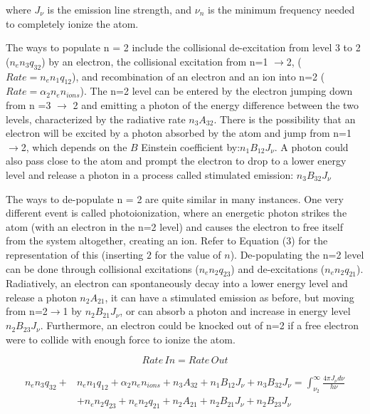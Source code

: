 \documentclass{article}
\begin{document}
where $J_{\nu}$ is the emission line strength, and $\nu_n$ is the minimum frequency needed to completely ionize the atom.

The ways to populate n = 2 include the collisional de-excitation from level 3 to 2 ($n_e n_{3} q_{32}$) by an electron, the collisional excitation from  n=1 $\rightarrow$2, ($Rate = n_e n_{1} q_{12}$), and recombination of an electron and an ion into n=2 ($Rate = \alpha_2 n_e n_{ions} $). The n=2 level can be entered by the electron jumping down from n =3 $\rightarrow$ 2 and emitting a photon of the energy difference between the two levels, characterized by the radiative rate $n_3 A_{32}$. There is the possibility that an electron will be excited by a photon absorbed by the atom and jump from n=1$\rightarrow$2, which depends on the $B$ Einstein coefficient by:$n_1 B_12 J_{\nu}$. A photon could also pass close to the atom and prompt the electron to drop to a lower energy level and release a photon in a process called stimulated emission: $n_3 B_32 J_{\nu}$

The ways to de-populate n = 2 are quite similar in many instances. One very different event is called photoionization, where an energetic photon strikes the atom (with an electron in the n=2 level) and causes the electron to free itself from the system altogether, creating an ion. Refer to Equation (3) for the representation of this (inserting $2$ for the value of $n$). De-populating the n=2 level can be done through collisional excitations ($n_e n_{2} q_{23}$) and de-excitations ($n_e n_{2} q_{21}$). Radiatively, an electron can spontaneously decay into a lower energy level and release a photon $n_2 A_{21}$, it can have a stimulated emission as before, but moving from n=2$\rightarrow$1 by $n_2 B_21 J_{\nu}$, or can absorb a photon and increase in energy level $n_2 B_23 J_{\nu}$. Furthermore, an electron could be knocked out of n=2 if a free electron were to collide with enough force to ionize the atom.

\begin{equation}
Rate \, In = Rate \, Out
\end{equation}

\begin{equation}
\begin{split}
n_e n_{3} q_{32} + & n_e n_{1} q_{12} + \alpha_2 n_e n_{ions} + n_3 A_{32} + n_1 B_12 J_{\nu} + n_3 B_32 J_{\nu} =  \int_{\nu_2}^\infty \frac{4 \pi J_{\nu} d\nu}{h \nu} \\
& + n_e n_{2} q_{23} + n_e n_{2} q_{21} + n_2 A_{21} + n_2 B_21 J_{\nu} + n_2 B_23 J_{\nu}
\end{split}
\end{equation}
\end{document}
